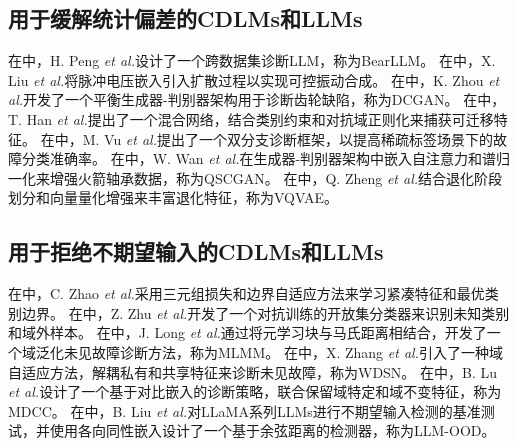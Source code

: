 \documentclass[UTF8,lettersize,journal]{IEEEtran}
\begin{document}
\subsection{用于缓解统计偏差的CDLMs和LLMs}
在\cite{Peng_Liu_Du_Gao_Wang_2025}中，H. Peng \emph{et al.}设计了一个跨数据集诊断LLM，称为BearLLM。
在\cite{VGCDM}中，X. Liu \emph{et al.}将脉冲电压嵌入引入扩散过程以实现可控振动合成。
在\cite{DCGAN}中，K. Zhou \emph{et al.}开发了一个平衡生成器-判别器架构用于诊断齿轮缺陷，称为DCGAN。
在\cite{WOS:000688310200005}中，T. Han \emph{et al.}提出了一个混合网络，结合类别约束和对抗域正则化来捕获可迁移特征。
在\cite{10478558}中，M. Vu \emph{et al.}提出了一个双分支诊断框架，以提高稀疏标签场景下的故障分类准确率。
在\cite{QSCGAN}中，W. Wan \emph{et al.}在生成器-判别器架构中嵌入自注意力和谱归一化来增强火箭轴承数据，称为QSCGAN。
在\cite{VQVAE}中，Q. Zheng \emph{et al.}结合退化阶段划分和向量量化增强来丰富退化特征，称为VQVAE。



\subsection{用于拒绝不期望输入的CDLMs和LLMs}
在\cite{ZHAO2022108672}中，C. Zhao \emph{et al.}采用三元组损失和边界自适应方法来学习紧凑特征和最优类别边界。
在\cite{10262196}中，Z. Zhu \emph{et al.}开发了一个对抗训练的开放集分类器来识别未知类别和域外样本。
在\cite{10214410}中，J. Long \emph{et al.}通过将元学习块与马氏距离相结合，开发了一个域泛化未见故障诊断方法，称为MLMM。
在\cite{ZHANG2023109518}中，X. Zhang \emph{et al.}引入了一种域自适应方法，解耦私有和共享特征来诊断未见故障，称为WDSN。
在\cite{10382502}中，B. Lu \emph{et al.}设计了一个基于对比嵌入的诊断策略，联合保留域特定和域不变特征，称为MDCC。
在\cite{20242516270368}中，B. Liu \emph{et al.}对LLaMA系列LLMs进行不期望输入检测的基准测试，并使用各向同性嵌入设计了一个基于余弦距离的检测器，称为LLM-OOD。
\end{document}
